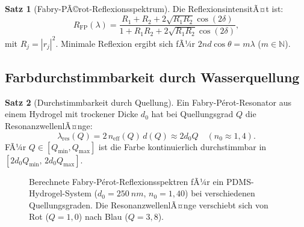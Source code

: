 ﻿\documentclass[a4paper,12pt]{scrreprt}
\theoremstyle{definition}
\newtheorem{satz}{Satz}[section]
\newcommand{\neff}{n_\mathrm{eff}}
\begin{document}
\begin{satz}[Fabry-PÃ©rot-Reflexionsspektrum]
  Die ReflexionsintensitÃ¤t ist:
  \begin{equation}
    R_\mathrm{FP}(\lambda) = \frac{R_1 + R_2 + 2\sqrt{R_1 R_2}\cos(2\delta)}
    {1 + R_1 R_2 + 2\sqrt{R_1 R_2}\cos(2\delta)},
    \label{eq:fp-intensitaet}
  \end{equation}
  mit $R_j = |r_j|^2$. Minimale Reflexion ergibt sich fÃ¼r $2nd\cos\theta = m\lambda$
  ($m \in \mathbb{N}$).
\end{satz}

\subsection{Farbdurchstimmbarkeit durch Wasserquellung}

\begin{satz}[Durchstimmbarkeit durch Quellung]
  Ein Fabry-P{\'e}rot-Resonator aus einem Hydrogel mit trockener Dicke $d_0$
  hat bei Quellungsgrad $Q$ die ResonanzwellenlÃ¤nge:
  \begin{equation}
    \lambda_\mathrm{res}(Q) = 2\,\neff(Q)\,d(Q) \approx 2d_0 Q \quad (n_0 \approx 1{,}4).
    \label{eq:lambda-quellung}
  \end{equation}
  FÃ¼r $Q \in [Q_\mathrm{min}, Q_\mathrm{max}]$ ist die Farbe kontinuierlich
  durchstimmbar in $[2d_0 Q_\mathrm{min},\, 2d_0 Q_\mathrm{max}]$.
\end{satz}

\begin{figure}[htb]
  \centering
  \caption{Berechnete Fabry-P{\'e}rot-Reflexionsspektren fÃ¼r ein PDMS-Hydrogel-System
    ($d_0 = \SI{250}{nm}$, $n_0 = 1{,}40$) bei verschiedenen Quellungsgraden.
    Die ResonanzwellenlÃ¤nge verschiebt sich von Rot ($Q=1{,}0$) nach Blau ($Q=3{,}8$).}
  \label{fig:fp-spektren}
\end{figure}
\end{document}
